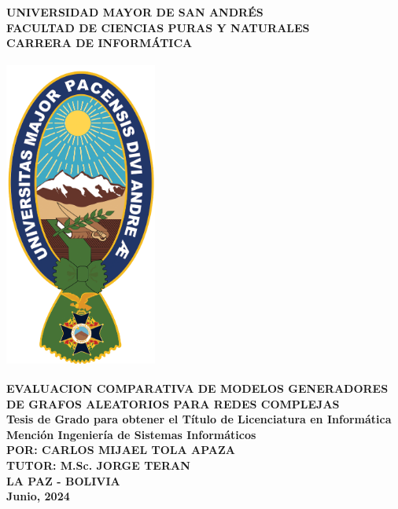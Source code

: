 \documentclass[12pt, openany]{book}
\title{}
\author{}
\date{}
\begin{document}
\begin{titlepage}
  \centering
  \textbf{\Large{UNIVERSIDAD MAYOR DE SAN ANDR\'ES}}\\
  \textbf{\normalsize{FACULTAD DE CIENCIAS PURAS Y NATURALES}}\\
  \textbf{\normalsize{CARRERA DE INFORM\'ATICA}}\\
  \vspace{1cm}
  \includegraphics[width=5cm,height=11cm]{umsa}\\
  \vspace{1cm}
  \textbf{\large{EVALUACION COMPARATIVA DE MODELOS GENERADORES DE GRAFOS ALEATORIOS PARA REDES COMPLEJAS}}\\
  \textbf{\small{Tesis de Grado para obtener el Título de Licenciatura en Informática}}\\
  \textbf{\small{Mención Ingeniería de Sistemas Informáticos}}\\
  \vspace{1cm}
  \textbf{\large{POR: CARLOS MIJAEL TOLA APAZA}}\\
  \textbf{\large{TUTOR: M.Sc. JORGE TERAN}}\\
  \vfill
  \textbf{\small{LA PAZ - BOLIVIA}}\\
  \textbf{\small{Junio, 2024}}\\
\end{titlepage}


\newpage
\thispagestyle{plain} %
\vspace*{\fill} 
\end{document}

